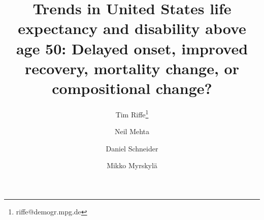 \newcommand{\absdiv}[1]{%
  \par\addvspace{.5\baselineskip}%
  \noindent\textbf{#1}\quad\ignorespaces
}
\newcommand{\rd}[1]{\textcolor{red}{#1}}




\title{Trends in United States life expectancy and disability above age 50: Delayed onset, improved recovery, mortality change, or compositional change?}

\author[1]{Tim Riffe\thanks{riffe@demogr.mpg.de}}
\author[2]{Neil Mehta}
\author[1]{Daniel Schneider}
\author[1,3]{Mikko Myrskyl\"a}



%              
%

\maketitle

\vspace{-2em}

